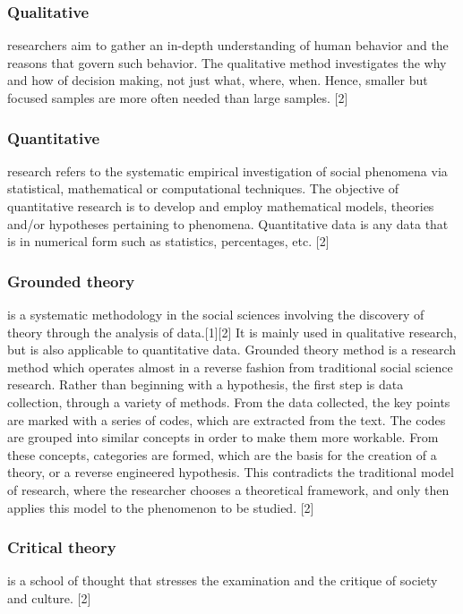 \subsubsection{Qualitative}
 researchers aim to gather an in-depth understanding of human behavior and the reasons that govern such behavior. The qualitative method investigates the why and how of decision making, not just what, where, when. Hence, smaller but focused samples are more often needed than large samples. [2]

\subsubsection{Quantitative}
 research refers to the systematic empirical investigation of social phenomena via statistical, mathematical or computational techniques. The objective of quantitative research is to develop and employ mathematical models, theories and/or hypotheses pertaining to phenomena. Quantitative data is any data that is in numerical form such as statistics, percentages, etc. [2]

\subsubsection{Grounded theory}

is a systematic methodology in the social sciences involving the discovery of theory through the analysis of data.[1][2] It is mainly used in qualitative research, but is also applicable to quantitative data. Grounded theory method is a research method which operates almost in a reverse fashion from traditional social science research. Rather than beginning with a hypothesis, the first step is data collection, through a variety of methods. From the data collected, the key points are marked with a series of codes, which are extracted from the text. The codes are grouped into similar concepts in order to make them more workable. From these concepts, categories are formed, which are the basis for the creation of a theory, or a reverse engineered hypothesis. This contradicts the traditional model of research, where the researcher chooses a theoretical framework, and only then applies this model to the phenomenon to be studied. [2]

\subsubsection{Critical theory }
is a school of thought that stresses the examination and the critique of society and culture. [2]

